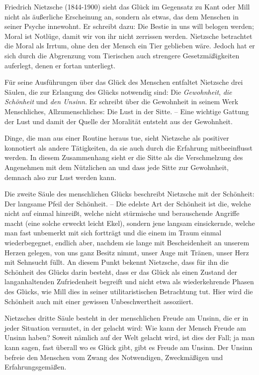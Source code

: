 Friedrich Nietzsche (1844-1900) sieht das Glück im Gegensatz zu Kant oder Mill nicht als äußerliche Erscheinung an, sondern als etwas, das dem Menschen in seiner Psyche innewohnt. 
Er schreibt dazu: \glqq Die Bestie in uns will belogen werden; Moral ist Notlüge, damit wir von ihr nicht zerrissen werden.\grqq{} \cite[S.\,57]{FN06}
Nietzsche betrachtet die Moral als Irrtum, ohne den der Mensch ein Tier geblieben wäre. 
Jedoch hat er sich durch die Abgrenzung vom Tierischen auch strengere Gesetzmäßigkeiten auferlegt, denen er fortan unterliegt.

Für seine Ausführungen über das Glück des Menschen entfaltet Nietzsche drei Säulen, die zur Erlangung des Glücks notwendig sind: Die \textit{Gewohnheit}, \textit{die Schönheit} und \textit{den Unsinn}. 
Er schreibt über die Gewohnheit in seinem Werk \glqq Menschliches, Allzumenschliches\grqq{}: \glqq Die Lust in der Sitte. -- Eine wichtige Gattung der Lust und damit der Quelle der Moralität entsteht aus der Gewohnheit.\grqq{} \cite[S.\,84]{FN06}

Dinge, die man aus einer Routine heraus tue, sieht Nietzsche als positiver konnotiert als andere Tätigkeiten, da sie auch durch die Erfahrung mitbeeinflusst werden. 
In diesem Zusammenhang sieht er die Sitte als die Verschmelzung des Angenehmen mit dem Nützlichen an und dass jede Sitte zur Gewohnheit, demnach also zur Lust werden kann.

Die zweite Säule des menschlichen Glücks beschreibt Nietzsche mit der Schönheit: \glqq Der langsame Pfeil der Schönheit. -- Die edelste Art der Schönheit ist die, welche nicht auf einmal hinreißt, welche nicht stürmische und berauschende Angriffe macht (eine solche erweckt leicht Ekel), sondern jene langsam einsickernde, welche man fast unbemerkt mit sich fortträgt und die einem im Traum einmal wiederbegegnet, endlich aber, nachdem sie lange mit Bescheidenheit an unserem Herzen gelegen, von uns ganz Besitz nimmt, unser Auge mit Tränen, unser Herz mit Sehnsucht füllt.\grqq{} \cite[S.\,131]{FN06}
An diesem Punkt bekennt Nietzsche, dass für ihn die Schönheit des Glücks darin besteht, dass er das Glück als einen Zustand der langanhaltenden Zufriedenheit begreift und nicht etwa als wiederkehrende Phasen des Glücks, wie Mill dies in seiner utilitaristischen Betrachtung tut. 
Hier wird die Schönheit auch mit einer gewissen Unbeschwertheit assoziiert.

Nietzsches dritte Säule besteht in der menschlichen Freude am Unsinn, die er in jeder Situation vermutet, in der gelacht wird: \glqq Wie kann der Mensch Freude am Unsinn haben? Soweit nämlich auf der Welt gelacht wird, ist dies der Fall; ja man kann sagen, fast überall wo es Glück gibt, gibt es Freude am Unsinn.\grqq{} \cite[S.\,159]{FN06}
Der Unsinn befreie den Menschen vom Zwang des \glqq Notwendigen, Zweckmäßigen und Erfahrungsgemäßen\grqq{}. \cite[S.\,159]{FN06}


